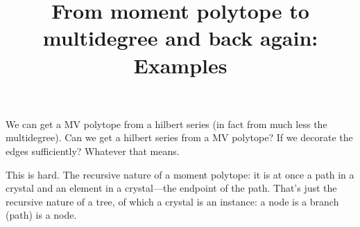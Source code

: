 \documentclass[11pt]{article}
\title{From moment polytope to multidegree and back again: Examples}
\date{\vspace{-10ex}}
\begin{document}
\maketitle
% 
\begin{goal}
    We can get a MV polytope from a hilbert series (in fact from much less the multidegree). Can we get a hilbert series from a MV polytope? If we decorate the edges sufficiently? Whatever that means.
\end{goal}
% 
This is hard.
% 
    The recursive nature of a moment polytope: it is at once a path in a crystal and an element in a crystal---the endpoint of the path. That's just the recursive nature of a tree, of which a crystal is an instance: a node is a branch (path) is a node.
\end{document}
